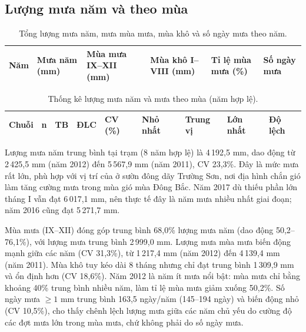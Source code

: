 \subsection{Lượng mưa năm và theo mùa}

\begin{table}[H]
  \centering
  \caption{Tổng lượng mưa năm, mưa mùa mưa, mùa khô và số ngày mưa theo năm.}
  \label{tab:nam}
  \footnotesize
  \begin{tabularx}{\linewidth}{|c|Y|Y|Y|Y|Y|}
    \hline
    \textbf{Năm} & \textbf{Mưa năm (mm)} & \textbf{Mùa mưa IX--XII (mm)} & \textbf{Mùa khô I--VIII (mm)} & \textbf{Tỉ lệ mùa mưa (\%)} & \textbf{Số ngày mưa} \\
    \hline
    
  \end{tabularx}
\end{table}

\begin{table}[H]
  \centering
  \caption{Thống kê lượng mưa năm và mưa theo mùa (năm hợp lệ).}
  \label{tab:nam-thongke}
  \footnotesize
  \begin{tabularx}{\linewidth}{|l|Y|Y|Y|Y|Y|Y|Y|Y|}
    \hline
    \textbf{Chuỗi} & \textbf{n} & \textbf{TB} & \textbf{ĐLC} & \textbf{CV (\%)} & \textbf{Nhỏ nhất} & \textbf{Trung vị} & \textbf{Lớn nhất} & \textbf{Độ lệch} \\
    \hline
    
  \end{tabularx}
\end{table}

Lượng mưa năm trung bình tại trạm \TenTram{} (8 năm hợp lệ) là 4\,192,5 mm, dao động từ 2\,425,5 mm (năm 2012) đến 5\,567,9 mm (năm 2011), CV 23,3\%. Đây là mức mưa rất lớn, phù hợp với vị trí của \TenTram{} ở sườn đông dãy Trường Sơn, nơi địa hình chắn gió làm tăng cường mưa trong mùa gió mùa Đông Bắc. Năm 2017 dù thiếu phần lớn tháng I vẫn đạt 6\,017,1 mm, nên thực tế đây là năm mưa nhiều nhất giai đoạn; năm 2016 cũng đạt 5\,271,7 mm.

Mùa mưa (IX--XII) đóng góp trung bình 68,0\% lượng mưa năm (dao động 50,2--76,1\%), với lượng mưa trung bình 2\,999,0 mm. Lượng mưa mùa mưa biến động mạnh giữa các năm (CV 31,3\%), từ 1\,217,4 mm (năm 2012) đến 4\,139,4 mm (năm 2011). Mùa khô tuy kéo dài 8 tháng nhưng chỉ đạt trung bình 1\,309,9 mm và ổn định hơn (CV 18,6\%). Năm 2012 là năm ít mưa nổi bật: mùa mưa chỉ bằng khoảng 40\% trung bình nhiều năm, làm tỉ lệ mùa mưa giảm xuống 50,2\%. Số ngày mưa $\geq 1$ mm trung bình 163,5 ngày/năm (145--194 ngày) và biến động nhỏ (CV 10,5\%), cho thấy chênh lệch lượng mưa giữa các năm chủ yếu do cường độ các đợt mưa lớn trong mùa mưa, chứ không phải do số ngày mưa.

